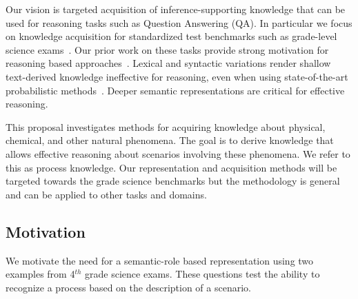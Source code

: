 Our vision is targeted acquisition of inference-supporting knowledge that can be used for reasoning tasks such as Question Answering (QA).
In particular we focus on knowledge acquisition for standardized test benchmarks such as grade-level science exams~\cite{clark2015elementary}.  Our prior work on these tasks provide strong motivation for reasoning based approaches~\cite{clark2014:akbc,chb2013:akbc}.
Lexical and syntactic variations render shallow text-derived knowledge ineffective for reasoning, even when using state-of-the-art probabilistic methods~\cite{khot2015:emlnlp}. 
Deeper semantic representations are critical for effective reasoning.

This proposal investigates methods for acquiring knowledge about physical, chemical, and other natural phenomena.
The goal is to derive knowledge that allows effective reasoning about scenarios involving these phenomena. We refer to this as process knowledge. 
Our representation and acquisition methods will be targeted towards the grade science benchmarks but the methodology is general and can be applied to other tasks and domains.

\subsection{Motivation}
We motivate the need for a semantic-role based representation using two examples from 4$^{th}$ grade science exams. These questions test the ability to recognize a process based on the description of a scenario. \\
\begin{center}
\\
\end{center}


